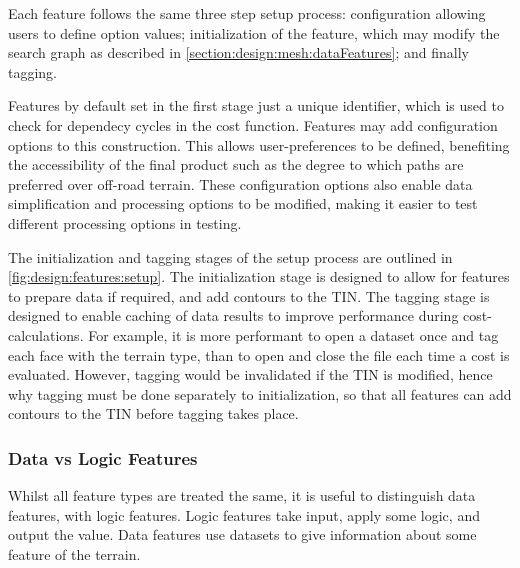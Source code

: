 \documentclass[12pt]{article}
\begin{document}
Each feature follows the same three step setup process: configuration allowing users to define option values; initialization of the feature, which may modify the search graph as described in \autoref{section:design:mesh:dataFeatures}; and finally tagging.


Features by default set in the first stage just a unique identifier, which is used to check for dependecy cycles in the cost function. Features may add configuration options to this construction. This allows user-preferences to be defined, benefiting the accessibility of the final product such as the degree to which paths are preferred over off-road terrain. These configuration options also enable data simplification and processing options to be modified, making it easier to test different processing options in testing.


The initialization and tagging stages of the setup process are outlined in \autoref{fig:design:features:setup}. The initialization stage is designed to allow for features to prepare data if required, and add contours to the TIN. The tagging stage is designed to enable caching of data results to improve performance during cost-calculations. For example, it is more performant to open a dataset once and tag each face with the terrain type, than to open and close the file each time a cost is evaluated. However, tagging would be invalidated if the TIN is modified, hence why tagging must be done separately to initialization, so that all features can add contours to the TIN before tagging takes place.



\subsubsection{Data vs Logic Features}

Whilst all feature types are treated the same, it is useful to distinguish data features, with logic features. Logic features take input, apply some logic, and output the value. Data features use datasets to give information about some feature of the terrain.
\end{document}
